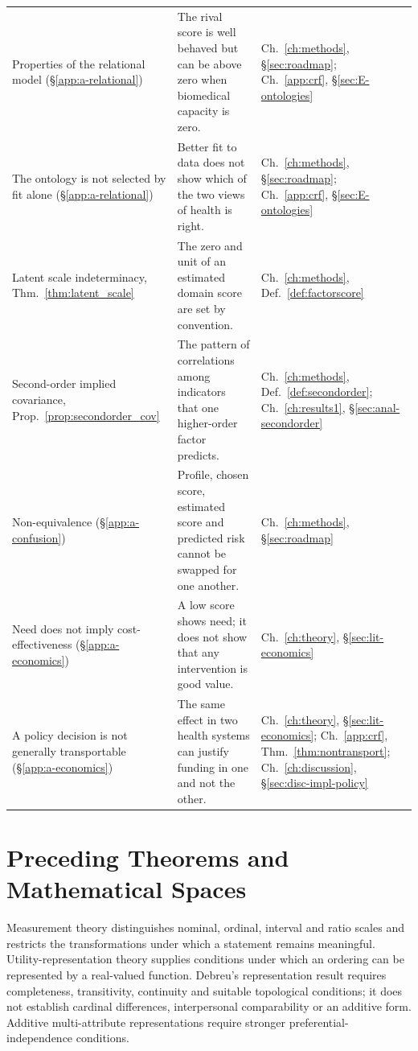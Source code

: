 \begin{table}[htbp]
\begin{tabular}{p{3.4cm}p{5.8cm}p{3.9cm}}
Properties of the relational model (\S\ref{app:a-relational}) & The rival score is well behaved but can be above zero when biomedical capacity is zero. & Ch.~\ref{ch:methods}, \S\ref{sec:roadmap}; Ch.~\ref{app:crf}, \S\ref{sec:E-ontologies} \\
The ontology is not selected by fit alone (\S\ref{app:a-relational}) & Better fit to data does not show which of the two views of health is right. & Ch.~\ref{ch:methods}, \S\ref{sec:roadmap}; Ch.~\ref{app:crf}, \S\ref{sec:E-ontologies} \\
Latent scale indeterminacy, Thm.~\ref{thm:latent_scale} & The zero and unit of an estimated domain score are set by convention. & Ch.~\ref{ch:methods}, Def.~\ref{def:factorscore} \\
Second-order implied covariance, Prop.~\ref{prop:secondorder_cov} & The pattern of correlations among indicators that one higher-order factor predicts. & Ch.~\ref{ch:methods}, Def.~\ref{def:secondorder}; Ch.~\ref{ch:results1}, \S\ref{sec:anal-secondorder} \\
Non-equivalence (\S\ref{app:a-confusion}) & Profile, chosen score, estimated score and predicted risk cannot be swapped for one another. & Ch.~\ref{ch:methods}, \S\ref{sec:roadmap} \\
Need does not imply cost-effectiveness (\S\ref{app:a-economics}) & A low score shows need; it does not show that any intervention is good value. & Ch.~\ref{ch:theory}, \S\ref{sec:lit-economics} \\
A policy decision is not generally transportable (\S\ref{app:a-economics}) & The same effect in two health systems can justify funding in one and not the other. & Ch.~\ref{ch:theory}, \S\ref{sec:lit-economics}; Ch.~\ref{app:crf}, Thm.~\ref{thm:nontransport}; Ch.~\ref{ch:discussion}, \S\ref{sec:disc-impl-policy} \\
\bottomrule
\end{tabular}
\end{table}

\section{Preceding Theorems and Mathematical Spaces}
\label{app:a-preceding}

Measurement theory distinguishes nominal, ordinal, interval and ratio scales
and restricts the transformations under which a statement remains meaningful.
\citep{stevens_1946} Utility-representation theory supplies conditions under
which an ordering can be represented by a real-valued function. Debreu's
representation result requires completeness, transitivity, continuity and
suitable topological conditions; it does not establish cardinal differences,
interpersonal comparability or an additive form. \citep{debreu_1954} Additive
multi-attribute representations require stronger preferential-independence
conditions. \citep{keeney_raiffa_1976}

